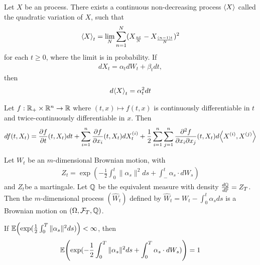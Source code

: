 \begin{thm}
  \label{sec:brown-moti-stoch-9}
  Let $X$ be an \ito process. There exists a continuous non-decreasing
  process $\IP{X}$ called the quadratic variation of $X$, such that
  \begin{align}
    \label{eq:18}
    \IP{X}_{t} = \lim_{N} \sum_{n=1}^{N} (X_{\frac{nt}{N}} - X_{\frac{(n-1)t}{N}})^{2}
  \end{align} for each $t \geq 0$, where the limit is in probability.
  If
  \begin{align}
    \label{eq:19}
    dX_{t} = \alpha_{t} dW_{t} + \beta_{t} dt,
  \end{align} then
  \begin{align}
    \label{eq:20}
    d \IP{X}_{t} = \alpha_{t}^{2} dt
  \end{align}
\end{thm}

\begin{thm}
  \label{sec:brown-moti-stoch-10}
  Let $f : \mathbb{R}_{+} \times \mathbb{R}^{n} \rightarrow \mathbb{R}$ where $(t, x) \mapsto
  f(t, x)$ is continuously differentiable in $t$ and
  twice-continuously differentiable in $x$.  Then
  \begin{align}
    \label{eq:21}
    df(t, X_{t}) = \frac{\partial f}{\partial t} (t, X_{t}) dt +
    \sum_{i=1}^{n} \frac{\partial f}{\partial x_{i}} (t, X_{t})
    dX_{t}^{(i)} + \frac{1}{2} \sum_{i=1}^{n} \sum_{j=1}^{n}
    \frac{\partial^{2} f}{\partial x_{i} \partial x_{j}}(t, X_{t}) d
    \IP{X^{(i)}, X^{(j)}}
  \end{align}
\end{thm}

\begin{thm}
  \label{sec:brown-moti-stoch-11}
  Let $W_{t}$ be an $m$-dimensional Brownian motion, with
  \begin{align}
    \label{eq:22}
    Z_{t} = \exp(-\frac{1}{2} \int_{0}^{t} \| \alpha_{s} \|^{2} ds +
    \int_{-}^{t} \alpha_{s} \cdot dW_{s})
  \end{align} and $Z_{t}$be a martingale.  Let $\Q$ be the equivalent
  measure with density $\frac{d\Q}{d\Prob} = Z_{T}$.  Then the
  $m$-dimensional process $(\hat W_{t})$ defined by $\hat W_{t} =
  W_{t} - \int_{0}^{t} \alpha_{s} ds$ is a Brownian motion on
  $(\Omega, \mathcal{F}_{T}, \Q)$.
\end{thm}

\begin{thm}
  \label{sec:brown-moti-stoch-12}
  If $\E{\exp(\frac{1}{2} \int_{0}^{T} \| \alpha_{s} \|^{2} ds)} <
  \infty$, then 
  \begin{equation}
    \label{eq:33}
    \E{\exp(-\frac{1}{2} \int_{0}^{T} \|\alpha_{s}\|^{2}
      ds + \int_{0}^{T} \alpha_{s} \cdot dW_{s})} = 1    
  \end{equation}
\end{thm}

